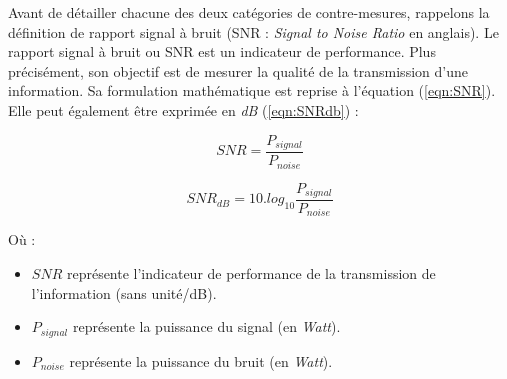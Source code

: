 \documentclass[10pt, oneside, a4paper]{article}
\begin{document}
\vspace{-0.2 cm}Avant de détailler chacune des deux catégories de contre-mesures, rappelons la définition de rapport signal à bruit (SNR : \textit{Signal to Noise Ratio} en anglais). Le rapport signal à bruit ou SNR est un indicateur de performance. Plus précisément, son objectif est de mesurer la qualité de la transmission d'une information. Sa formulation mathématique est reprise à l'équation (\ref{eqn:SNR}). Elle peut également être exprimée en \textit{dB} (\ref{eqn:SNRdb}) : \\

\begin{minipage}{6cm}
\begin{equation}SNR = \frac{P_{signal}}{P_{noise}} \label{eqn:SNR} \end{equation} 
\end{minipage}
\begin{minipage}{6cm}
\begin{equation}SNR_{dB} = 10.log_{10}\frac{P_{signal}}{P_{noise}} \label{eqn:SNRdb}\end{equation}
\end{minipage}

\hspace{-0.5 cm}Où :
\begin{itemize}
\item $SNR$ représente l'indicateur de performance de la transmission de l'information (sans unité/dB).
\item $P_{signal}$ représente la puissance du signal (en \textit{Watt}).
\item $P_{noise}$ représente la puissance du bruit (en \textit{Watt}). \\
\end{itemize}
\end{document}

